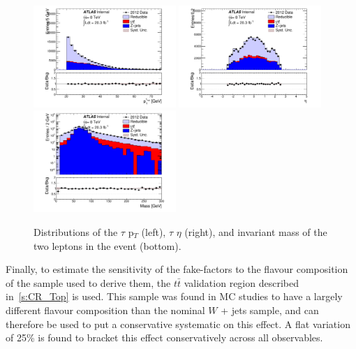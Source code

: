 \begin{figure}
\centering \includegraphics[width=0.48\textwidth]{figures/ch5-model-independent/TauFakes_ClosurePt}
\centering \includegraphics[width=0.48\textwidth]{figures/ch5-model-independent/TauFakes_ClosureEta}
\centering \includegraphics[width=0.48\textwidth]{figures/ch5-model-independent/TauFakes_ClosureMass}
\caption{\label{fig:tauclosure} Distributions of the $\tau$ p$_{T}$ (left), $\tau$ $\eta$
  (right), and invariant mass of the two leptons in the event (bottom).}
\end{figure}


Finally, to estimate the sensitivity of the fake-factors to the flavour composition of the
sample used to derive them, the $t\bar{t}$ validation region described in~\ref{s:CR_Top}
is used. This sample was found in MC studies to have a largely different flavour
composition than the nominal $W$ + jets sample, and can therefore be used to put a
conservative systematic on this effect.  A flat variation of 25\% is found to bracket this
effect conservatively across all observables.

